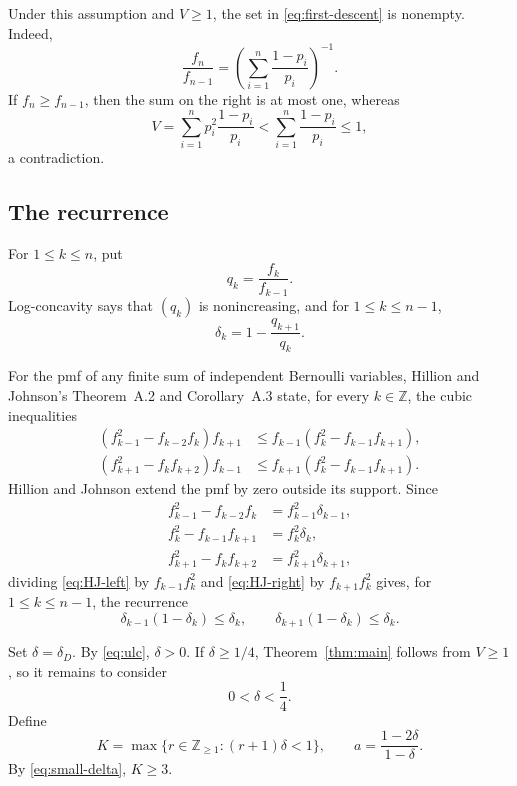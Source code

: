 \documentclass[ECP,preprint]{ejpecp}
\begin{document}
Under this assumption and $V\geq1$, the set in \eqref{eq:first-descent} is
nonempty. Indeed,
\[
  \frac{f_n}{f_{n-1}}
  =\left(\sum_{i=1}^n\frac{1-p_i}{p_i}\right)^{-1}.
\]
If $f_n\geq f_{n-1}$, then the sum on the right is at most one, whereas
\[
  V=\sum_{i=1}^n p_i^2\frac{1-p_i}{p_i}
  <\sum_{i=1}^n\frac{1-p_i}{p_i}\leq1,
\]
a contradiction.

\subsection{The recurrence}

For $1\leq k\leq n$, put
\[
  q_k=\frac{f_k}{f_{k-1}}.
\]
Log-concavity says that $(q_k)$ is nonincreasing, and for
$1\leq k\leq n-1$,
\begin{equation}\label{eq:delta-ratio}
  \delta_k=1-\frac{q_{k+1}}{q_k}.
\end{equation}

For the pmf of any finite sum of independent Bernoulli variables, Hillion and
Johnson's Theorem~A.2 and Corollary~A.3 state, for every $k\in\mathbb Z$,
the cubic inequalities \cite[equations~(78)--(79)]{hillionjohnson2016}
\begin{align}
  (f_{k-1}^2-f_{k-2}f_k)f_{k+1}
  &\leq f_{k-1}(f_k^2-f_{k-1}f_{k+1}),
  \label{eq:HJ-left}\\
  (f_{k+1}^2-f_kf_{k+2})f_{k-1}
  &\leq f_{k+1}(f_k^2-f_{k-1}f_{k+1}).
  \label{eq:HJ-right}
\end{align}
Hillion and Johnson extend the pmf by zero outside its support. Since
\[
\begin{aligned}
  f_{k-1}^2-f_{k-2}f_k&=f_{k-1}^2\delta_{k-1},\\
  f_k^2-f_{k-1}f_{k+1}&=f_k^2\delta_k,\\
  f_{k+1}^2-f_kf_{k+2}&=f_{k+1}^2\delta_{k+1},
\end{aligned}
\]
dividing \eqref{eq:HJ-left} by $f_{k-1}f_k^2$ and \eqref{eq:HJ-right} by
$f_{k+1}f_k^2$ gives, for $1\leq k\leq n-1$, the recurrence
\begin{equation}\label{eq:deficit-recurrence}
  \delta_{k-1}(1-\delta_k)\leq\delta_k,
  \qquad
  \delta_{k+1}(1-\delta_k)\leq\delta_k.
\end{equation}

Set $\delta=\delta_D$. By \eqref{eq:ulc}, $\delta>0$. If $\delta\geq1/4$,
Theorem~\ref{thm:main} follows from $V\geq1$, so it remains to consider
\begin{equation}\label{eq:small-delta}
  0<\delta<\frac14.
\end{equation}
Define
\begin{equation}\label{eq:K-a}
  K=\max\{r\in\mathbb Z_{\geq1}:(r+1)\delta<1\},
  \qquad
  a=\frac{1-2\delta}{1-\delta}.
\end{equation}
By \eqref{eq:small-delta}, $K\geq3$.
\end{document}
